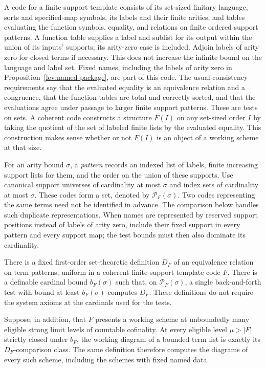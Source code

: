 A code for a finite-support template consists of its set-sized
finitary language, sorts and specified-map symbols, its labels and
their finite arities, and tables evaluating the function symbols,
equality, and relations on finite ordered support patterns.  A
function table supplies a label and sublist for its output within
the union of its inputs' supports; its arity-zero case is included.
Adjoin labels of arity zero for closed terms if necessary.  This
does not increase the infinite bound on the language and label set.
Fixed names, including
the labels of arity zero in Proposition~\ref{lev:named-package}, are
part of this code.  The usual consistency requirements say that the
evaluated equality is an equivalence relation and a congruence, that
the function tables are total and correctly sorted, and that the
evaluations agree under passage to larger finite support
patterns.  These are tests on sets.  A coherent code constructs a
structure $F(I)$ on any set-sized order $I$ by taking the quotient
of the set of labeled finite lists by the evaluated equality.  This
construction makes sense whether or not $F(I)$ is an object of a
working scheme at that size.

For an arity bound $\sigma$, a \emph{pattern} records an indexed list
of labels, finite increasing support lists for them, and the order
on the union of these supports.  Use canonical support universes
of cardinality at most $\sigma$ and index sets of cardinality at most
$\sigma$.  These codes form a set, denoted by $\mathcal P_F(\sigma)$.
Two codes representing the same terms need not be identified in
advance.  The comparison below handles such duplicate representations.
When names are represented by reserved support positions instead of
labels of arity zero, include their fixed support in every pattern
and every support map; the test bounds must then also dominate its
cardinality.

\begin{proposition}
\label{lev:diagram-coding}
There is a fixed first-order set-theoretic definition $D_F$ of an
equivalence relation on term patterns, uniform in a coherent
finite-support template code $F$.  There is a definable cardinal
bound $b_F(\sigma)$ such that, on $\mathcal P_F(\sigma)$, a single
back-and-forth test with bound at least $b_F(\sigma)$ computes $D_F$.
These definitions do not require the system axioms at the cardinals
used for the tests.

Suppose, in addition, that $F$ presents a working scheme at unboundedly
many eligible strong limit levels of countable cofinality.  At every
eligible level $\mu>|F|$ strictly closed under $b_F$, the working
diagram of a bounded term list is exactly its $D_F$-comparison class.
The same definition therefore computes the diagrams of every such
scheme, including the schemes with fixed named data.
\end{proposition}

